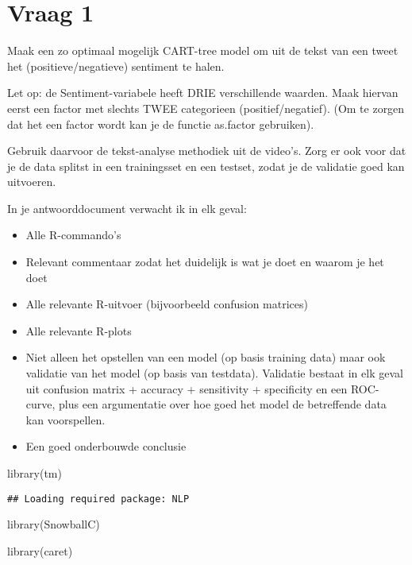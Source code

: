 \documentclass[
]{article}
\newenvironment{Shaded}{\begin{snugshade}}{\end{snugshade}}
\newcommand{\FunctionTok}[1]{\textcolor[rgb]{0.00,0.00,0.00}{#1}}
\newcommand{\NormalTok}[1]{#1}
\providecommand{\tightlist}{%
  \setlength{\itemsep}{0pt}\setlength{\parskip}{0pt}}
\begin{document}
\hypertarget{vraag-1}{%
\section{Vraag 1}\label{vraag-1}}

Maak een zo optimaal mogelijk CART-tree model om uit de tekst van een
tweet het (positieve/negatieve) sentiment te halen.

Let op: de Sentiment-variabele heeft DRIE verschillende waarden. Maak
hiervan eerst een factor met slechts TWEE categorieen
(positief/negatief). (Om te zorgen dat het een factor wordt kan je de
functie as.factor gebruiken).

Gebruik daarvoor de tekst-analyse methodiek uit de video's. Zorg er ook
voor dat je de data splitst in een trainingsset en een testset, zodat je
de validatie goed kan uitvoeren.

In je antwoorddocument verwacht ik in elk geval:

\begin{itemize}
\tightlist
\item
  Alle R-commando's
\item
  Relevant commentaar zodat het duidelijk is wat je doet en waarom je
  het doet
\item
  Alle relevante R-uitvoer (bijvoorbeeld confusion matrices)
\item
  Alle relevante R-plots
\item
  Niet alleen het opstellen van een model (op basis training data) maar
  ook validatie van het model (op basis van testdata). Validatie bestaat
  in elk geval uit confusion matrix + accuracy + sensitivity +
  specificity en een ROC-curve, plus een argumentatie over hoe goed het
  model de betreffende data kan voorspellen.
\item
  Een goed onderbouwde conclusie
\end{itemize}

\begin{Shaded}
\begin{Highlighting}[]
\FunctionTok{library}\NormalTok{(tm)}
\end{Highlighting}
\end{Shaded}

\begin{verbatim}
## Loading required package: NLP
\end{verbatim}

\begin{Shaded}
\begin{Highlighting}[]
\FunctionTok{library}\NormalTok{(SnowballC)}

\FunctionTok{library}\NormalTok{(caret)}
\end{Highlighting}
\end{Shaded}
\end{document}
